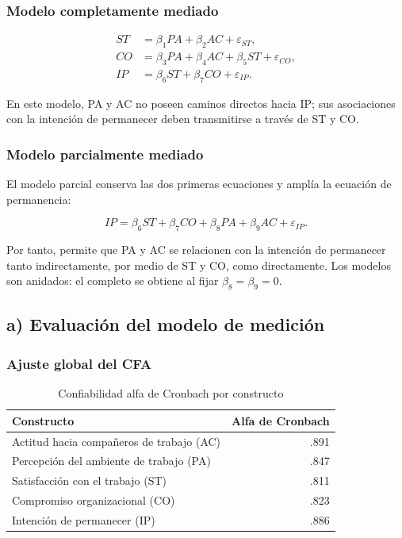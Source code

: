 \documentclass[12pt,letterpaper]{article}
\begin{document}
\subsubsection{Modelo completamente mediado}

\begin{align}
ST &= \beta_1 PA + \beta_2 AC + \varepsilon_{ST}, \\
CO &= \beta_3 PA + \beta_4 AC + \beta_5 ST + \varepsilon_{CO}, \\
IP &= \beta_6 ST + \beta_7 CO + \varepsilon_{IP}.
\end{align}

En este modelo, PA y AC no poseen caminos directos hacia IP; sus asociaciones con la intención de permanecer deben transmitirse a través de ST y CO.

\subsubsection{Modelo parcialmente mediado}

El modelo parcial conserva las dos primeras ecuaciones y amplía la ecuación de permanencia:

\begin{equation}
IP = \beta_6 ST + \beta_7 CO + \beta_8 PA + \beta_9 AC + \varepsilon_{IP}.
\end{equation}

Por tanto, permite que PA y AC se relacionen con la intención de permanecer tanto indirectamente, por medio de ST y CO, como directamente. Los modelos son anidados: el completo se obtiene al fijar $\beta_8=\beta_9=0$.

\subsection{a) Evaluación del modelo de medición}

\subsubsection{Ajuste global del CFA}

\begin{table}[H]
\centering
\caption{Confiabilidad alfa de Cronbach por constructo}
\label{tab:p3-alpha}
\begin{tabular}{lr}
\toprule
Constructo & Alfa de Cronbach \\
\midrule
Actitud hacia compañeros de trabajo (AC) & .891 \\
Percepción del ambiente de trabajo (PA) & .847 \\
Satisfacción con el trabajo (ST) & .811 \\
Compromiso organizacional (CO) & .823 \\
Intención de permanecer (IP) & .886 \\
\bottomrule
\end{tabular}
\end{table}
\end{document}
